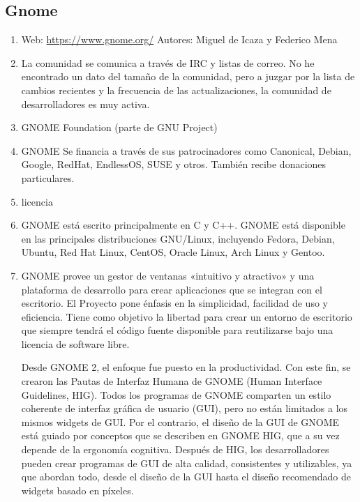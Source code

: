 \subsection{Gnome}
\begin{enumerate}
    \item Web: \url{https://www.gnome.org/} Autores:  Miguel de Icaza y Federico Mena 
    \item La comunidad se comunica a través de IRC y listas de correo. No he encontrado un dato del tamaño de la comunidad, pero a juzgar por la lista de cambios recientes y la frecuencia de las actualizaciones, la comunidad de desarrolladores es muy activa.
    \item GNOME Foundation (parte de GNU Project)
    \item GNOME Se financia a través de sus patrocinadores como Canonical, Debian, Google, RedHat, EndlessOS, SUSE y otros. También recibe donaciones particulares.
    \item licencia
    \item GNOME está escrito principalmente en C y C++. GNOME está disponible en las principales distribuciones GNU/Linux, incluyendo Fedora, Debian, Ubuntu, Red Hat Linux, CentOS, Oracle Linux, Arch Linux y Gentoo.
    \item GNOME provee un gestor de ventanas «intuitivo y atractivo» y una plataforma de desarrollo para crear aplicaciones que se integran con el escritorio. El Proyecto pone énfasis en la simplicidad, facilidad de uso y eficiencia. Tiene como objetivo la libertad para crear un entorno de escritorio que siempre tendrá el código fuente disponible para reutilizarse bajo una licencia de software libre.
    
    Desde GNOME 2, el enfoque fue puesto en la productividad. Con este fin, se crearon las Pautas de Interfaz Humana de GNOME (Human Interface Guidelines, HIG). Todos los programas de GNOME comparten un estilo coherente de interfaz gráfica de usuario (GUI), pero no están limitados a los mismos widgets de GUI. Por el contrario, el diseño de la GUI de GNOME está guiado por conceptos que se describen en GNOME HIG, que a su vez depende de la ergonomía cognitiva. Después de HIG, los desarrolladores pueden crear programas de GUI de alta calidad, consistentes y utilizables, ya que abordan todo, desde el diseño de la GUI hasta el diseño recomendado de widgets basado en píxeles.
\end{enumerate}


